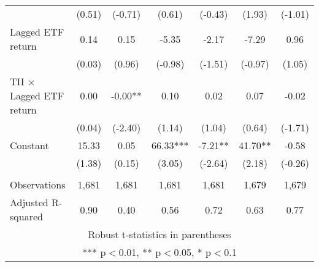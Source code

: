 \documentclass[]{article}
\begin{document}
\begin{tabular}{lcccccc}
 & (0.51) & (-0.71) & (0.61) & (-0.43) & (1.93) & (-1.01) \\
Lagged ETF return & 0.14 & 0.15 & -5.35 & -2.17 & -7.29 & 0.96 \\
 & (0.03) & (0.96) & (-0.98) & (-1.51) & (-0.97) & (1.05) \\
TII $\times$ Lagged ETF return & 0.00 & -0.00** & 0.10 & 0.02 & 0.07 & -0.02 \\
 & (0.04) & (-2.40) & (1.14) & (1.04) & (0.64) & (-1.71) \\
Constant & 15.33 & 0.05 & 66.33*** & -7.21** & 41.70** & -0.58 \\
 & (1.38) & (0.15) & (3.05) & (-2.64) & (2.18) & (-0.26) \\
 &  &  &  &  &  &  \\
Observations & 1,681 & 1,681 & 1,681 & 1,681 & 1,679 & 1,679 \\
 Adjusted R-squared & 0.90 & 0.40 & 0.56 & 0.72 & 0.63 & 0.77 \\ \hline
\multicolumn{7}{c}{ Robust t-statistics in parentheses} \\
\multicolumn{7}{c}{ *** p$<$0.01, ** p$<$0.05, * p$<$0.1} \\
\end{tabular}
\end{document}
